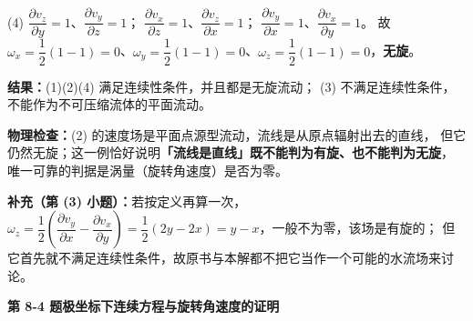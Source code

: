 \begin{jie}
(4) $\dfrac{\partial v_z}{\partial y}=1$、$\dfrac{\partial v_y}{\partial z}=1$；
$\dfrac{\partial v_x}{\partial z}=1$、$\dfrac{\partial v_z}{\partial x}=1$；
$\dfrac{\partial v_y}{\partial x}=1$、$\dfrac{\partial v_x}{\partial y}=1$。
故 $\omega_x=\dfrac{1}{2}(1-1)=0$、$\omega_y=\dfrac{1}{2}(1-1)=0$、$\omega_z=\dfrac{1}{2}(1-1)=0$，\textbf{无旋}。

\textbf{结果：}(1)(2)(4) 满足连续性条件，并且都是无旋流动；
(3) 不满足连续性条件，不能作为不可压缩流体的平面流动。

\textbf{物理检查：}(2) 的速度场是平面点源型流动，流线是从原点辐射出去的直线，
但它仍然无旋；这一例恰好说明\textbf{「流线是直线」既不能判为有旋、也不能判为无旋}，
唯一可靠的判据是涡量（旋转角速度）是否为零。

\textbf{补充（第 (3) 小题）：}若按定义再算一次，
$\omega_z=\dfrac{1}{2}\left(\dfrac{\partial v_y}{\partial x}-\dfrac{\partial v_x}{\partial y}\right)
=\dfrac{1}{2}(2y-2x)=y-x$，一般不为零，该场是有旋的；
但它首先就不满足连续性条件，故原书与本解都不把它当作一个可能的水流场来讨论。
\end{jie}

\noindent\textbf{第 8-4 题\quad 极坐标下连续方程与旋转角速度的证明}

